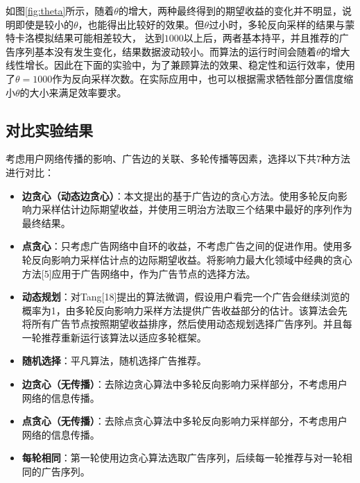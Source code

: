 如图\ref{fig:theta}所示，随着$\theta$的增大，两种最终得到的期望收益的变化并不明显，说明即使是较小的$\theta$，也能得出比较好的效果。但$\theta$过小时，多轮反向采样的结果与蒙特卡洛模拟结果可能相差较大， 达到$1000$以上后，两者基本持平，并且推荐的广告序列基本没有发生变化，结果数据波动较小。而算法的运行时间会随着$\theta$的增大线性增长。因此在下面的实验中，为了兼顾算法的效果、稳定性和运行效率，使用了$\theta=1000$作为反向采样次数。在实际应用中，也可以根据需求牺牲部分置信度缩小$\theta$的大小来满足效率要求。

\subsection{对比实验结果}

考虑用户网络传播的影响、广告边的关联、多轮传播等因素，选择以下共7种方法进行对比：

\begin{itemize}
    \item {\bfseries 边贪心（动态边贪心）}：本文提出的基于广告边的贪心方法。使用多轮反向影响力采样估计边际期望收益，并使用三明治方法取三个结果中最好的序列作为最终结果。
    \item {\bfseries 点贪心}：只考虑广告网络中自环的收益，不考虑广告之间的促进作用。使用多轮反向影响力采样估计点的边际期望收益。将影响力最大化领域中经典的贪心方法[5]应用于广告网络中，作为广告节点的选择方法。
    \item {\bfseries 动态规划}：对Tang[18]提出的算法微调，假设用户看完一个广告会继续浏览的概率为1，由多轮反向影响力采样方法提供广告收益部分的估计。该算法会先将所有广告节点按照期望收益排序，然后使用动态规划选择广告序列。并且每一轮推荐重新运行该算法以适应多轮框架。
    \item {\bfseries 随机选择}：平凡算法，随机选择广告推荐。
    \item {\bfseries 边贪心（无传播）}：去除边贪心算法中多轮反向影响力采样部分，不考虑用户网络的信息传播。
    \item {\bfseries 点贪心（无传播）}：去除点贪心算法中多轮反向影响力采样部分，不考虑用户网络的信息传播。
    \item {\bfseries 每轮相同}：第一轮使用边贪心算法选取广告序列，后续每一轮推荐与对一轮相同的广告序列。 
\end{itemize}

